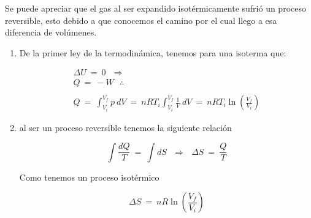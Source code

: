
Se puede apreciar que el gas al ser expandido isotérmicamente sufrió un proceso reversible, esto debido a que
conocemos el camino por el cual llego a esa diferencia de volúmenes.

\begin{enumerate}[label=\textbf{\alph* )}]
    \item{De la primer ley de la termodinámica, tenemos para una isoterma que:
    
    \begin{gather*}
        \Delta U\ =\ 0\ \ \ \Rightarrow\\
        Q\ =\ -W\ \ \ \therefore\\
        \\
        Q\ =\ \int_{V_{i}}^{V_{f}} p\ dV\ =\ nRT_{i} \int_{V_{i}}^{V_{f}} \frac{1}{V}\ dV\ =\ 
        \boxed{nRT_{i} \ln{\left(\frac{V_{f}}{V_{i}}\right)}}
    \end{gather*}
     } 

    \item{ al ser un proceso reversible tenemos la siguiente relación 
    
    \begin{equation}
        \int \frac{dQ}{T}\ =\ \int dS\ \ \ \Rightarrow\ \ \  \Delta S\ =\ \frac{Q}{T}
    \end{equation}
    
    Como tenemos un proceso isotérmico 

    \begin{equation*}   
        \boxed{\Delta S\ =\ nR\ln{\left(\frac{V_{f}}{V_{i}}\right)}}
    \end{equation*}
    }
\end{enumerate}